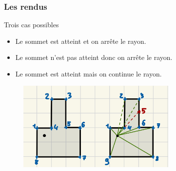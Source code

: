 \documentclass{beamer}
\begin{document}
\begin{frame}
    \frametitle{Les rendus}
    \begin{block}{Trois cas possibles}
        \begin{itemize}
            \item Le sommet est atteint et on arrête le rayon. 
            \item Le sommet n'est pas atteint donc on arrête le rayon.
            \item Le sommet est atteint mais on continue le rayon.
        \end{itemize}
    \end{block}
    \begin{figure}
        \centering
        \includegraphics[width=0.7\textwidth]{images/envoie-rayon-ordre.jpg}
    \end{figure}
\end{frame}

\end{document}
